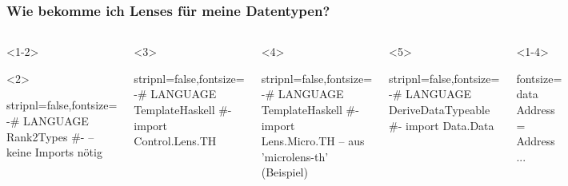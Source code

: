 \documentclass{beamer}
\begin{document}
\begin{frame}[fragile,t]
  \frametitle{Wie bekomme ich Lenses für meine Datentypen?}
  \vspace{-1.2em}
  \begin{columns}[t]
    \begin{onlyenv}<1-2>
      \begin{visibleenv}<2>
\begin{haskellcode*}{stripnl=false,fontsize=\small}
{-# LANGUAGE Rank2Types #-}
-- keine Imports nötig

\end{haskellcode*}
      \end{visibleenv}
    \end{onlyenv}
    \begin{onlyenv}<3>
\begin{haskellcode*}{stripnl=false,fontsize=\small}
{-# LANGUAGE TemplateHaskell #-}
import Control.Lens.TH

\end{haskellcode*}
    \end{onlyenv}
    \begin{onlyenv}<4>
\begin{haskellcode*}{stripnl=false,fontsize=\small}
{-# LANGUAGE TemplateHaskell #-}
import Lens.Micro.TH
-- aus 'microlens-th' (Beispiel)
\end{haskellcode*}
    \end{onlyenv}
    \begin{onlyenv}<5>
\begin{haskellcode*}{stripnl=false,fontsize=\small}
{-# LANGUAGE DeriveDataTypeable #-}
import Data.Data

\end{haskellcode*}
    \end{onlyenv}
    \begin{onlyenv}<1-4>
\begin{haskellcode*}{fontsize=\small}
data Address = Address {...}


\end{haskellcode*}
\end{onlyenv}
\end{columns}
\end{frame}
\end{document}
